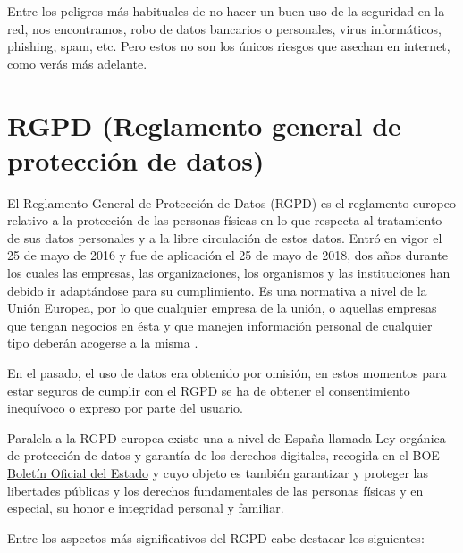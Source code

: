 \documentclass[
  spanish,
  a4paper,
  openany]{book}
\begin{document}
Entre los peligros más habituales de no hacer un buen uso de la seguridad en la red, nos encontramos, robo de datos bancarios o personales, virus informáticos, phishing, spam, etc. Pero estos no son los únicos riesgos que asechan en internet, como verás más adelante.

\hypertarget{rgpd-reglamento-general-de-protecciuxf3n-de-datos}{%
\section{RGPD (Reglamento general de protección de datos)}\label{rgpd-reglamento-general-de-protecciuxf3n-de-datos}}

El Reglamento General de Protección de Datos (RGPD) es el reglamento europeo relativo a la protección de las personas físicas en lo que respecta al tratamiento de sus datos personales y a la libre circulación de estos datos. Entró en vigor el 25 de mayo de 2016 y fue de aplicación el 25 de mayo de 2018, dos años durante los cuales las empresas, las organizaciones, los organismos y las instituciones han debido ir adaptándose para su cumplimiento. Es una normativa a nivel de la Unión Europea, por lo que cualquier empresa de la unión, o aquellas empresas que tengan negocios en ésta y que manejen información personal de cualquier tipo deberán acogerse a la misma \citep{WIKI-rgpd}.

En el pasado, el uso de datos era obtenido por omisión, en estos momentos para estar seguros de cumplir con el RGPD se ha de obtener el consentimiento inequívoco o expreso por parte del usuario.

Paralela a la RGPD europea existe una a nivel de España llamada Ley orgánica de protección de datos y garantía de los derechos digitales, recogida en el BOE \href{https://www.boe.es/buscar/doc.php?id=BOE-A-2018-16673}{Boletín Oficial del Estado} y cuyo objeto es también garantizar y proteger las libertades públicas y los derechos fundamentales de las personas físicas y en especial, su honor e integridad personal y familiar.

Entre los aspectos más significativos del RGPD cabe destacar los siguientes:
\end{document}
